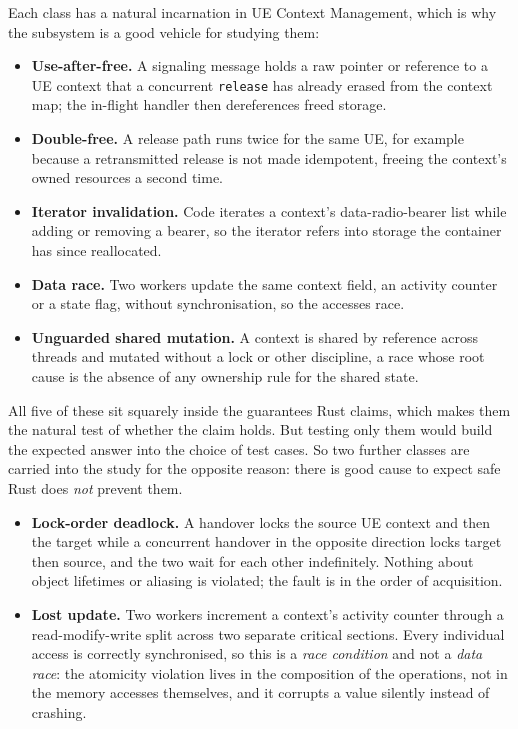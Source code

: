 \documentclass[english,twoside,openright,a4paper,censored,csm,software-track-2020]{HYthesisML}
\begin{document}
Each class has a natural incarnation in UE Context Management, which is why the subsystem is a
good vehicle for studying them:

\begin{itemize}
  \item \textbf{Use-after-free.} A signaling message holds a raw pointer or reference to a UE
        context that a concurrent \texttt{release} has already erased from the context map; the
        in-flight handler then dereferences freed storage.
  \item \textbf{Double-free.} A release path runs twice for the same UE, for example because a
        retransmitted release is not made idempotent, freeing the context's owned resources a
        second time.
  \item \textbf{Iterator invalidation.} Code iterates a context's data-radio-bearer list while
        adding or removing a bearer, so the iterator refers into storage the container has since
        reallocated.
  \item \textbf{Data race.} Two workers update the same context field, an activity counter or a
        state flag, without synchronisation, so the accesses race.
  \item \textbf{Unguarded shared mutation.} A context is shared by reference across threads and
        mutated without a lock or other discipline, a race whose root cause is the absence of any
        ownership rule for the shared state.
\end{itemize}

All five of these sit squarely inside the guarantees Rust claims, which makes them the natural
test of whether the claim holds. But testing only them would build the expected answer into the
choice of test cases. So two further classes are carried into the study for the opposite reason:
there is good cause to expect safe Rust does \emph{not} prevent them.

\begin{itemize}
  \item \textbf{Lock-order deadlock.} A handover locks the source UE context and then the
        target while a concurrent handover in the opposite direction locks target then source,
        and the two wait for each other indefinitely. Nothing about object lifetimes or
        aliasing is violated; the fault is in the order of acquisition.
  \item \textbf{Lost update.} Two workers increment a context's activity counter through a
        read-modify-write split across two separate critical sections. Every individual access
        is correctly synchronised, so this is a \emph{race condition} and not a
        \emph{data race}: the atomicity violation lives in the composition of the operations,
        not in the memory accesses themselves, and it corrupts a value silently instead of
        crashing.
\end{itemize}
\end{document}

